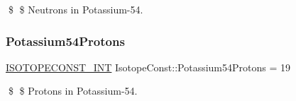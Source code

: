 \$ \$ Neutrons in Potassium-\/54. \mbox{\label{group___isotope_const-_potassium-_k54_gab3f05b939e2a27fd9ad985f72a1c0258}} 
\subsubsection{\texorpdfstring{Potassium54\+Protons}{Potassium54Protons}}
{\footnotesize\ttfamily \mbox{\hyperlink{group___isotope_const-_macros_ga5f18360b3e99483a35c32d789e62621c}{I\+S\+O\+T\+O\+P\+E\+C\+O\+N\+S\+T\+\_\+\+I\+NT}} Isotope\+Const\+::\+Potassium54\+Protons = 19}

\$ \$ Protons in Potassium-\/54. 